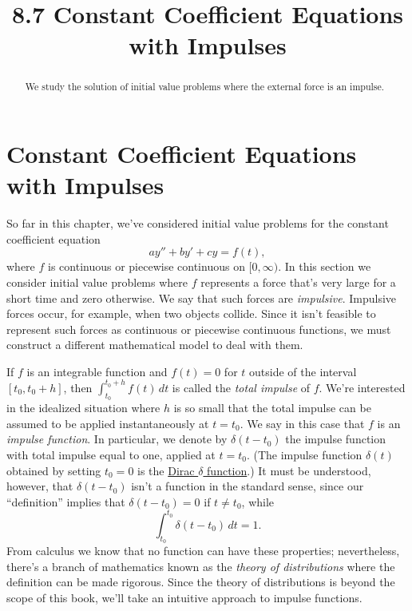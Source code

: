 \documentclass{ximera}
\title{8.7 Constant Coefficient Equations with Impulses}%
\begin{document}
\begin{abstract}
We study the solution of initial value problems where the external force is an impulse.
\end{abstract}

\maketitle

\section*{Constant Coefficient Equations with Impulses}

So far in this chapter, we've considered initial value problems
for the constant coefficient equation
$$
ay''+by'+cy=f(t),
$$
where $f$ is continuous or piecewise continuous on $[0,\infty)$. In
this section we consider initial value problems where $f$
represents a force that's very large for a short time and
zero otherwise. We say that such forces are \textit{impulsive}.
Impulsive forces occur, for example, when two objects collide. Since
it isn't  feasible to represent such forces as continuous or
piecewise continuous functions, we must construct a different
mathematical model to deal with them.

If $f$ is an integrable function and $f(t)=0$ for $t$ outside of
the interval $[t_0,t_0+h]$, then $\int_{t_0}^{t_0+h} f(t)\,dt$ is
called the \textit{total impulse} of $f$. We're interested in the
idealized situation where $h$ is so small that the total impulse
can be assumed to be applied instantaneously at $t=t_0$. We say in
this case that $f$ is an \textit{impulse function}. In particular, we
denote by $\delta(t-t_0)$ the impulse function with total impulse
equal to one, applied at $t=t_0$. (The impulse function $\delta(t)$
obtained by setting $t_0=0$ is  the
\href{http://www-history.mcs.st-and.ac.uk/Mathematicians/Dirac.html}
{Dirac $\delta$ function\/}.) It must be understood, however, that
$\delta(t-t_0)$ isn't  a function in the standard sense, since our
``definition'' implies that $\delta(t-t_0)=0$ if $t\neq t_0$, while
$$
\int_{t_0}^{t_0} \delta(t-t_0)\,dt=1.
$$
From calculus we know that no function can have these properties;
nevertheless, there's a branch of mathematics known as the
\textit{theory of distributions} where  the  definition can be made
rigorous. Since the theory of distributions is beyond the
scope of this book, we'll take an intuitive approach to impulse
functions.
\end{document}
